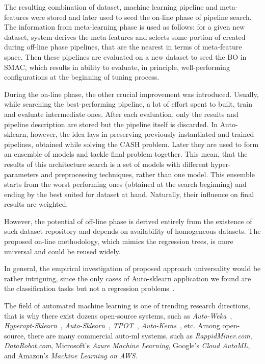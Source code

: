 The resulting combination of dataset, machine learning pipeline and meta-features were stored and later used to seed the on-line phase of pipeline search.
The information from meta-learning phase is used as follows: for a given new dataset, system derives the meta-features and selects some portion of created during off-line phase pipelines, that are the nearest in terms of meta-feature space. Then these pipelines are evaluated on a new dataset to seed the BO in SMAC, which results in ability to evaluate, in principle, well-performing configurations at the beginning of tuning process.

During the on-line phase, the other crucial improvement was introduced. 
Usually, while searching the best-performing pipeline, a lot of effort spent to built, train and evaluate intermediate ones. After each evaluation, only the results and pipeline description are stored but the pipeline itself is discarded. In Auto-sklearn, however, the idea lays in preserving previously instantiated and trained pipelines, obtained while solving the CASH problem. Later they are used to form an ensemble of models and tackle final problem together. This mean, that the results of this architecture search is a set of models with different hyper-parameters and preprocessing techniques, rather than one model. This ensemble starts from the worst performing ones (obtained at the search beginning) and ending by the best suited for dataset at hand. Naturally, their influence on final results are weighted.

However, the potential of off-line phase is derived entirely from the existence of such dataset repository and depends on availability of homogeneous datasets. The proposed on-line methodology, which mimics the regression trees, is more universal and could be reused widely.

In general, the empirical investigation of proposed approach universality would be rather intriguing, since the only cases of Auto-sklearn application we found are the classification tasks but not a regression problems~\cite{feurer2015efficient,biedenkapp-ecai20}.


The field of automated machine learning is one of trending research directions, that is why there exist dozens open-source systems, such as \textit{Auto-Weka}~\cite{thornton2013auto}, \textit{Hyperopt-Sklearn}~\cite{komer2014hyperopt}, \textit{Auto-Sklearn}~\cite{feurer2015efficient}, \textit{TPOT}~\cite{olson2019tpot}, \textit{Auto-Keras}~\cite{jin2019auto}, etc. Among open-source, there are many commercial auto-ml systems, such as \textit{RappidMiner.com}, \textit{DataRobot.com}, Microsoft’s \textit{Azure Machine Learning}, Google’s \textit{Cloud AutoML}, and Amazon's \textit{Machine Learning on AWS}.


